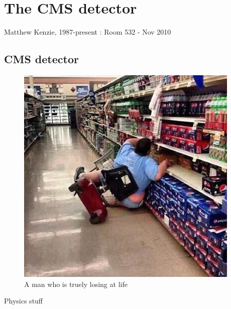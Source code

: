 \chapter{The CMS detector}
\label{chap:SomeStuff}


%
{Matthew Kenzie, 1987-present : Room 532 - Nov 2010}


\section{CMS detector}
\label{sec:cmsdetector}


\begin{figure}[h!]
  \includegraphics[width=\largefigwidth]{plots/toofat}
  \caption[A very fat man being too fat.]%
  {A man who is truely losing at life}
  \label{fig:fatman}
\end{figure}



Physics stuff


